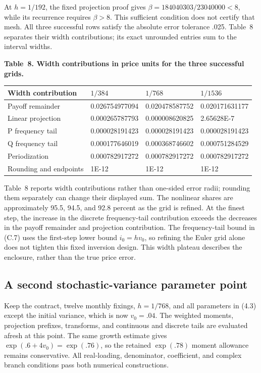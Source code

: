 At \(h=1/192\), the fixed projection proof gives
\(\beta=184040303/23040000<8\), while its recurrence requires \(\beta>8\).
This sufficient condition does not certify that mesh. All three successful
rows satisfy the absolute error tolerance .025. Table~8 separates their
width contributions; its exact unrounded entries sum to the interval widths.

\noindent\textbf{Table~8. Width contributions in price units for the three successful grids.}
\begin{center}
\begin{tabularx}{\textwidth}{@{}X X X X@{}}
\toprule
Width contribution & \(1/384\) & \(1/768\) & \(1/1536\) \\
\midrule
Payoff remainder & 0.026754977094 & 0.020478587752 & 0.020171631177 \\
Linear projection & 0.000265787793 & 0.000008620825 & 2.65628E-7 \\
P frequency tail & 0.000028191423 & 0.000028191423 & 0.000028191423 \\
Q frequency tail & 0.000177646019 & 0.000368746602 & 0.000751284529 \\
Periodization & 0.000782917272 & 0.000782917272 & 0.000782917272 \\
Rounding and endpoints & 1E-12 & 1E-12 & 1E-12 \\
\bottomrule
\end{tabularx}
\end{center}

Table~8 reports width contributions rather than one-sided error radii;
rounding them separately can change their displayed sum. The nonlinear shares
are approximately 95.5, 94.5, and 92.8 percent as the grid is refined. At the
finest step, the increase in the discrete frequency-tail contribution exceeds
the decreases in the payoff remainder and projection contribution. The
frequency-tail bound in (C.7) uses the first-step lower bound \(i_0=hv_0\),
so refining the Euler grid alone does not tighten this fixed inversion design.
This width plateau describes the enclosure, rather than the true price error.


\subsection{A second stochastic-variance parameter point}

Keep the contract, twelve monthly fixings, \(h=1/768\), and all parameters in
(4.3) except the initial variance, which is now \(v_0=.04\). The weighted
moments, projection prefixes, transforms, and continuous and discrete tails
are evaluated afresh at this point. The same growth estimate gives
\(\exp(.6+4v_0)=\exp(.76)\), so the retained \(\exp(.78)\) moment allowance
remains conservative. All real-loading, denominator, coefficient, and complex
branch conditions pass both numerical constructions.

